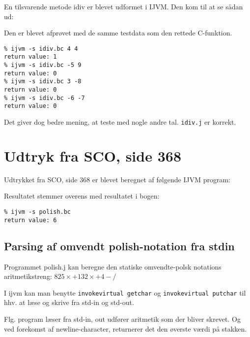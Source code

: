 \documentclass[12pt,a4paper]{article}
\begin{document}
En tilsvarende metode idiv er blevet udformet i IJVM. Den kom til at se sådan ud:

\lstset{language=JVMIS}


Den er blevet afprøvet med de samme testdata som den rettede C-funktion.

\lstset{language=sh}
\begin{lstlisting}
% ijvm -s idiv.bc 4 4
return value: 1
% ijvm -s idiv.bc -5 9
return value: 0
% ijvm -s idiv.bc 3 -8
return value: 0
% ijvm -s idiv.bc -6 -7
return value: 0
\end{lstlisting}

Det giver dog bedre mening, at teste med nogle andre tal. \texttt{idiv.j} er korrekt.

\section{Udtryk fra SCO, side 368}
Udtrykket fra SCO, side 368 er blevet beregnet af følgende IJVM program:

\lstset{language=JVMIS}



Resultatet stemmer overens med resultatet i bogen:
\lstset{language=sh}
\begin{lstlisting}
% ijvm -s polish.bc
return value: 6
\end{lstlisting}

\subsection{Parsing af omvendt polish-notation fra stdin}
Programmet polish.j kan beregne den statiske omvendte-polsk notations aritmetikstreng:
$825\times+132\times+4-/$

I ijvm kan man benytte \texttt{invokevirtual getchar} og \texttt{invokevirtual putchar} til hhv. at læse og skrive fra std-in og std-out.

Flg. program læser fra std-in, out udfører aritmetik som der bliver skrevet. Og ved forekomst af newline-character, returnerer det den øverste værdi på stakken.
\end{document}
